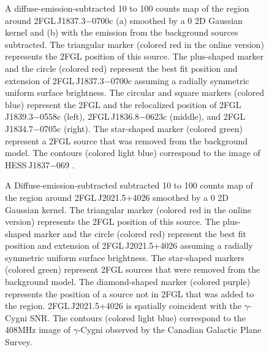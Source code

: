 \documentclass[12pt,preprint]{aastex}
\newif\ifcolorfigure
\newcommand{\gev}{\text{GeV}\xspace}
\newcommand{\tev}{\text{TeV}\xspace}
\begin{document}
\begin{figure}
    \ifcolorfigure
      \plotone{source_plots/source_HESS_J1837-069_color.eps}
    \else
    \fi
  \caption{
  A diffuse-emission-subtracted 10 \gev to 100 \gev counts map of the
  region around 2FGL\,J1837.3$-$0700c (a) smoothed by a 0 2D Gaussian
  kernel and (b) with the emission from the background sources subtracted.
  The triangular marker (colored red in the online version) represents
  the 2FGL
  position of this source. The plus-shaped marker and 
  the circle (colored red) represent
  the best fit position and extension of 2FGL\,J1837.3$-$0700c assuming a
  radially symmetric uniform surface brightness. The circular
  and square markers 
  (colored blue) represent the 2FGL and the relocalized position of
  2FGL\,J1839.3$-$0558c (left), 2FGL\,J1836.8$-$0623c (middle),
  and 2FGL\,J1834.7$-$0705c (right).  The star-shaped marker 
  (colored green) represent a
  2FGL source that was removed from the background model.  
  The contours (colored light blue) correspond to the \tev image of
  HESS\,J1837$-$069
  \citep{hess_plane_survey}.}\label{1FGL_J1837.5-0659c}
\end{figure}


\begin{figure}
    \ifcolorfigure
      \plotone{source_plots/source_Gamma_Cygni_color.eps}
    \else
    \fi
  \caption{A Diffuse-emission-subtracted 
  subtracted 10 \gev to 100 \gev counts map of the
  region around 2FGL\,J2021.5+4026 smoothed by a 0 2D Gaussian
  kernel. The triangular marker (colored red in the online version)
  represents the 2FGL position of this source.  The plus-shaped
  marker and the circle (colored red) represent the best fit position
  and extension of 2FGL\,J2021.5+4026 assuming a radially symmetric
  uniform surface brightness.  The star-shaped markers (colored green)
  represent 2FGL sources that were removed from the background model.
  The diamond-shaped marker (colored purple) represents the position of
  a
  source not in 2FGL that was added to the region. 2FGL\,J2021.5+4026
  is spatially coincident with the $\gamma$-Cygni SNR.  The contours
  (colored light blue) correspond to the 408MHz image of $\gamma$-Cygni
  observed by the Canadian Galactic Plane Survey.
  }\label{1FGL_J2020.0+4049}
\end{figure}
\end{document}
